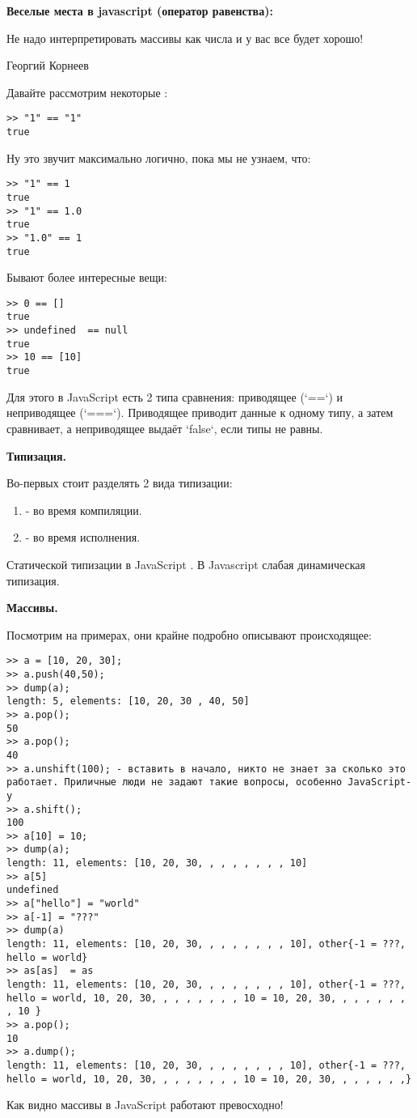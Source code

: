 \textbf{Веселые места в javascript (оператор равенства):}

\epigraph{Не надо интерпретировать массивы как числа и у вас все будет хорошо!}{Георгий Корнеев}

Давайте рассмотрим некоторые :
\begin{verbatim}
>> "1" == "1"
true
\end{verbatim}
Ну это звучит максимально логично, пока мы не узнаем, что:
\begin{verbatim}
>> "1" == 1
true
>> "1" == 1.0
true
>> "1.0" == 1
true
\end{verbatim}
Бывают более интересные вещи:
\begin{verbatim}
>> 0 == []
true
>> undefined  == null
true
>> 10 == [10]
true
\end{verbatim}

Для этого в JavaScript есть 2 типа сравнения: приводящее (`==`) и неприводящее (`===`). Приводящее приводит данные к одному типу, а затем сравнивает, а неприводящее выдаёт `false`, если типы не равны.

\textbf{Типизация.}

Во-первых стоит разделять 2 вида типизации:
\begin{enumerate}
    \item {} - во время компиляции.
    \item {} - во время исполнения.
\end{enumerate}

Статической типизации в JavaScript . В Javascript слабая динамическая типизация.

\textbf{Массивы.}

Посмотрим на примерах, они крайне подробно описывают происходящее:
\begin{verbatim}
>> a = [10, 20, 30];
>> a.push(40,50);
>> dump(a);
length: 5, elements: [10, 20, 30 , 40, 50]
>> a.pop();
50
>> a.pop();
40
>> a.unshift(100); - вставить в начало, никто не знает за сколько это работает. Приличные люди не задают такие вопросы, особенно JavaScript-у
>> a.shift();
100
>> a[10] = 10;
>> dump(a);
length: 11, elements: [10, 20, 30, , , , , , , , 10]
>> a[5]
undefined
>> a["hello"] = "world"
>> a[-1] = "???"
>> dump(a)
length: 11, elements: [10, 20, 30, , , , , , , , 10], other{-1 = ???, hello = world}
>> as[as]  = as
length: 11, elements: [10, 20, 30, , , , , , , , 10], other{-1 = ???, hello = world, 10, 20, 30, , , , , , , , 10 = 10, 20, 30, , , , , , , , 10 }
>> a.pop();
10
>> a.dump();
length: 11, elements: [10, 20, 30, , , , , , , , 10], other{-1 = ???, hello = world, 10, 20, 30, , , , , , , , 10 = 10, 20, 30, , , , , , ,}
\end{verbatim}
Как видно массивы в JavaScript работают превосходно!

